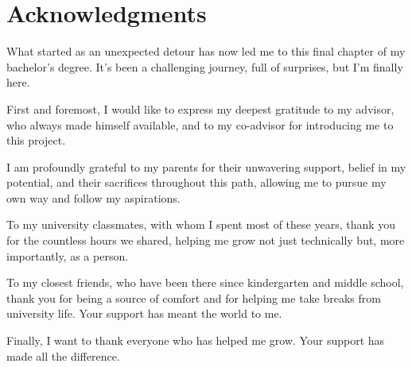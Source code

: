 \chapter*{Acknowledgments}

What started as an unexpected detour has now led me to this final chapter of my bachelor’s degree. It’s been a challenging journey, full of surprises, but I’m finally here.

First and foremost, I would like to express my deepest gratitude to my advisor, who always made himself available, and to my co-advisor for introducing me to this project.

I am profoundly grateful to my parents for their unwavering support, belief in my potential, and their sacrifices throughout this path, allowing me to pursue my own way and follow my aspirations.

To my university classmates, with whom I spent most of these years, thank you for the countless hours we shared, helping me grow not just technically but, more importantly, as a person.

To my closest friends, who have been there since kindergarten and middle school, thank you for being a source of comfort and for helping me take breaks from university life. Your support has meant the world to me.

Finally, I want to thank everyone who has helped me grow. Your support has made all the difference. 
